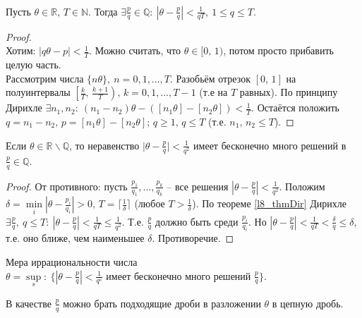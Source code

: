 \begin{theorem} \label{l8_thmDir}~\\
	Пусть $\theta \in \mathbb{R}, \, T \in \mathbb{N}$. Тогда 
	$\displaystyle \exists \frac{p}{q} \in \mathbb{Q}: \ \left| \theta - \frac{p}{q} \right| < \frac{1}{qT}, \ 1 \leq q \leq T$.
\end{theorem}
\begin{proof}~\\
	Хотим: $\displaystyle |q\theta - p| < \frac{1}{T}$. Можно считать, что $\theta \in [0, \, 1)$, потом просто прибавить целую часть.\\
	Рассмотрим числа $\{ n\theta \}, \ n = 0,1,\dots,T$. Разобьём отрезок $[0, \, 1]$ на полуинтервалы 
	$\displaystyle \left[ \frac{k}{T}, \, \frac{k+1}{T} \right), \, k=0,1,\dots,T-1$ (т.е на $T$ равных). По принципу Дирихле 
	$\displaystyle \exists n_1,n_2: \ \left( n_1 - n_2 \right)\theta - \left( \left[n_1\theta\right]-\left[n_2\theta\right] \right) < \frac{1}{T}$. 
	Остаётся положить $q = n_1-n_2, \, p = \left[ n_1\theta \right] - \left[ n_2\theta \right]$; $q \geq 1, \, q \leq T$ (т.е. $n_1,\,n_2 \leq T$).
\end{proof}

\begin{corollary}
	Если $\theta \in \mathbb{R} \backslash \mathbb{Q}$, то неравенство 
	$\displaystyle \lvert \theta - \frac{p}{q} \rvert < \frac{1}{q^2}$ имеет бесконечно много решений в $\frac{p}{q} \in \mathbb{Q}$.
\end{corollary}
\begin{proof}
	От противного: пусть $\displaystyle \frac{p_1}{q_1},\dots,\frac{p_k}{q_k}$ -- все решения $\displaystyle \left| \theta - \frac{p}{q} \right| < \frac{1}{q^2}$. Положим $\displaystyle \delta = \min\limits_i \left| \theta - \frac{p_i}{q_i} \right| > 0, \, T = \lceil \frac{1}{\delta} \rceil$ (любое $\displaystyle T > \frac{1}{\delta}$). По теореме \ref{l8_thmDir} Дирихле $\displaystyle \exists \frac{p}{q}, \ q \leq T: \ \left| \theta - \frac{p}{q} \right| < \frac{1}{qT} \leq \frac{1}{q^2}$. Т.е. $\displaystyle \frac{p}{q}$ должно быть среди $\displaystyle \frac{p_i}{q_i}$. Но $\displaystyle \left| \theta - \frac{p}{q} \right| < \frac{1}{qT} < \frac{\delta}{q} \leq \delta$, т.е. оно ближе, чем наименьшее $\delta$. Противоречие.
\end{proof}

Мера иррациональности числа $\displaystyle \theta = \sup\limits_s : \ \{ \left| \theta - \frac{p}{q} \right| < \frac{1}{q^s} \text{ имеет бесконечно много решений } \frac{p}{q} \}$.

В качестве $\displaystyle \frac{p}{q}$ можно брать подходящие дроби в разложении $\theta$ в цепную дробь.